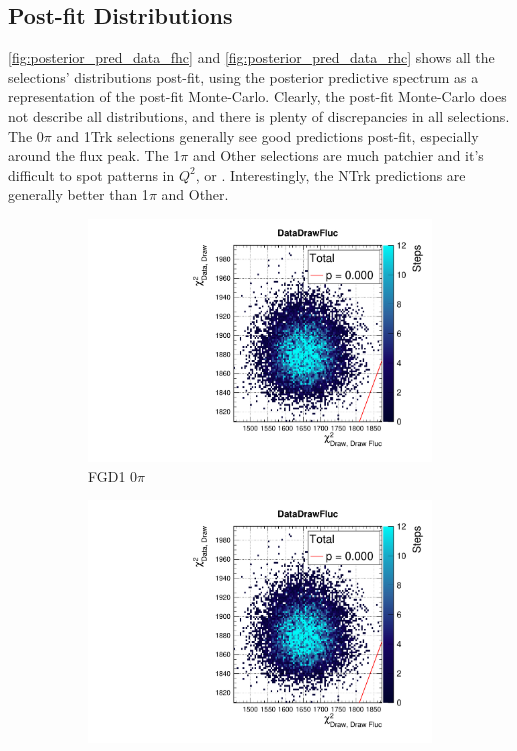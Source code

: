 \subsection{Post-fit Distributions}
\autoref{fig:posterior_pred_data_fhc} and \autoref{fig:posterior_pred_data_rhc} shows all the selections' \pmu \cosmu distributions post-fit, using the posterior predictive spectrum as a representation of the post-fit Monte-Carlo. Clearly, the post-fit Monte-Carlo does not describe all distributions, and there is plenty of discrepancies in all selections. The 0$\pi$ and 1Trk selections generally see good predictions post-fit, especially around the flux peak. The 1$\pi$ and Other selections are much patchier and it's difficult to spot patterns in $Q^2$, \pmu or \cosmu. Interestingly, the NTrk predictions are generally better than 1$\pi$ and Other.
\begin{figure}[h]
	\begin{subfigure}[t]{0.32\textwidth}
		\includegraphics[width=\textwidth, trim={20mm 6mm 4mm 11mm}, clip,page=5]{figures/mach3/data/postpred/2017b_NewData_NewDet_UpdXsecStep_2Xsec_4Det_5Flux_0_PostPred_procs}
		\caption{FGD1 0$\pi$}
	\end{subfigure}
	\begin{subfigure}[t]{0.32\textwidth}
		\includegraphics[width=\textwidth, trim={20mm 6mm 4mm 11mm}, clip,page=14]{figures/mach3/data/postpred/2017b_NewData_NewDet_UpdXsecStep_2Xsec_4Det_5Flux_0_PostPred_procs}

\end{subfigure}
\end{figure}
